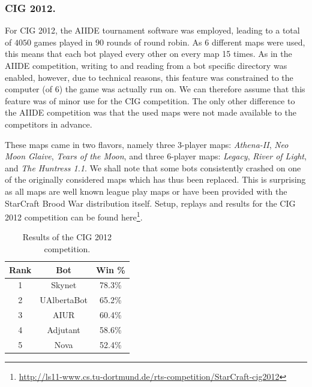 \documentclass{llncs}
\begin{document}
\subsubsection*{CIG 2012.}

For CIG 2012, the AIIDE tournament software was employed,
leading to a total of $4050$ games played in $90$ rounds
of round robin. As 6 different maps were used, this means
that each bot played every other on every map 15 times. 
As in the AIIDE competition, writing to and reading from
a bot specific directory was enabled, however, due to 
technical reasons, this feature was constrained to the
computer (of 6) the game was actually run on. We can 
therefore assume that this feature was of minor use for
the CIG competition. The only other difference to the
AIIDE competition was that the used maps were not 
made available to the competitors in advance. 

These maps came in two flavors, namely three 3-player maps:
\emph{Athena-II}, \emph{Neo Moon Glaive}, \emph{Tears of the Moon},
and three 6-player maps:
\emph{Legacy}, \emph{River of Light}, and 
\emph{The Huntress 1.1}. 
We shall note that some bots consistently crashed on one
of the originally considered maps which has thus been replaced.
This is surprising as all maps are well known league play maps
or have been provided with the StarCraft Brood War distribution
itself.
Setup, replays and results for the CIG 2012 competition can be found
here\footnote{\url{http://ls11-www.cs.tu-dortmund.de/rts-competition/StarCraft-cig2012}}.

\begin{table}[t]
\caption{Results of the CIG 2012 competition.}
\label{tab:cig2012}
\centering
\begin{tabular}{|c|c|c|}
\hline
{\bfseries Rank} & {\bfseries Bot} & {\bfseries Win \%} \\
\hline
1 & Skynet & 78.3\% \\
2 & UAlbertaBot & 65.2\% \\
3 & AIUR & 60.4\% \\
4 & Adjutant & 58.6\% \\
5 & Nova & 52.4\% \\ 
\hline
\end{tabular}
\end{table}

\end{document}
